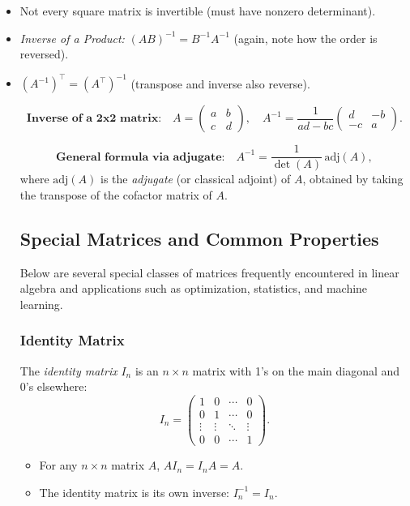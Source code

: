 \begin{itemize}
\item Not every square matrix is invertible (must have nonzero determinant).
\item \emph{Inverse of a Product:} $(AB)^{-1} = B^{-1} A^{-1}$ (again, note how the order is reversed).
\item $(A^{-1})^\top = (A^\top)^{-1}$ (transpose and inverse also reverse).

\[
\textbf{Inverse of a 2x2 matrix:}
\quad
A = \begin{pmatrix}
a & b \\
c & d
\end{pmatrix},
\quad
A^{-1} = \frac{1}{ad - bc}
\begin{pmatrix}
d & -b \\
-c & a
\end{pmatrix}.
\]

\[
\textbf{General formula via adjugate:}
\quad
A^{-1} = \frac{1}{\det(A)} \,\text{adj}(A),
\]
where \(\text{adj}(A)\) is the \emph{adjugate} (or classical adjoint) of \(A\), 
obtained by taking the transpose of the cofactor matrix of \(A\).

\subsection{Special Matrices and Common Properties}
Below are several special classes of matrices frequently encountered in linear algebra and 
applications such as optimization, statistics, and machine learning.

\subsubsection{Identity Matrix}
The \emph{identity matrix} $I_n$ is an $n \times n$ matrix with 1's on the main diagonal and 0's elsewhere:
\[
I_n = 
\begin{pmatrix}
1 & 0 & \cdots & 0 \\
0 & 1 & \cdots & 0 \\
\vdots & \vdots & \ddots & \vdots \\
0 & 0 & \cdots & 1
\end{pmatrix}.
\]
\begin{itemize}
    \item For any $n \times n$ matrix $A$, $A I_n = I_n A = A$.
    \item The identity matrix is its own inverse: $I_n^{-1} = I_n$.
\end{itemize}


\end{itemize}
